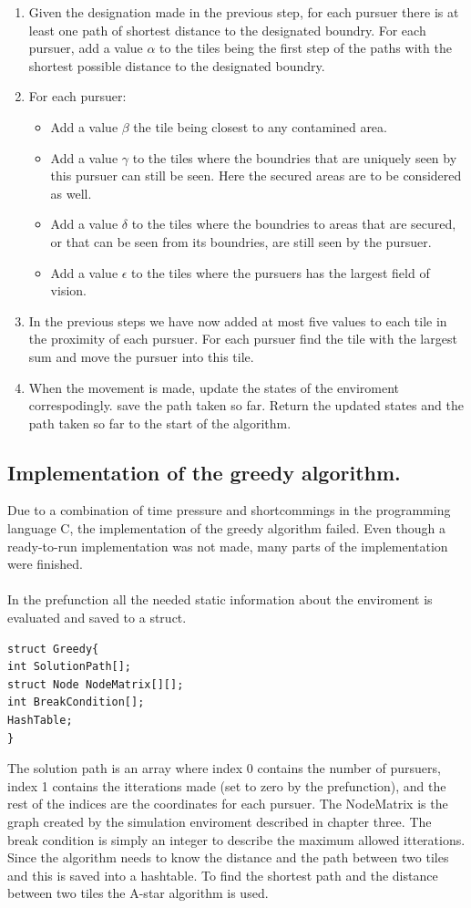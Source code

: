 \begin{enumerate}
\item{} Given the designation made in the previous step, for each pursuer there is at least one path of shortest distance to the designated boundry. For each pursuer,  add a value $\alpha$ to the tiles being the first step of the paths with the shortest possible distance to the designated boundry.
\item{} For each pursuer:
\begin{itemize}
\item{} Add a value $\beta$ the tile being closest to any contamined area. 
\item{} Add a value $\gamma$ to the tiles where the boundries that are uniquely seen by this pursuer can still be seen. Here the secured areas are to be considered as well.
\item{} Add a value $\delta$ to the tiles where the boundries to areas that are secured, or that can be seen from its boundries, are still seen by the pursuer.
\item{} Add a value $\epsilon$ to the tiles where the pursuers has the largest field of vision.
\end{itemize}
\item{} In the previous steps we have now added at most five values to each tile in the proximity of each pursuer. For each pursuer find the tile with the largest sum and move the pursuer into this tile.
\item{} When the movement is made, update the states of the enviroment correspodingly. save the path taken so far. Return the updated states and the path taken so far to the start of the algorithm. 
\end{enumerate}
\subsection{Implementation of the greedy algorithm.}
Due to a combination of time pressure and shortcommings in the programming language C, the implementation of the greedy algorithm failed. Even though a ready-to-run implementation was not made, many parts of the implementation were finished.\\
\\In the prefunction all the needed static information about the enviroment is evaluated and saved to a struct. 
\begin{verbatim}
struct Greedy{
int SolutionPath[]; 
struct Node NodeMatrix[][];
int BreakCondition[];
HashTable; 
}
\end{verbatim}
The solution path is an array where index 0 contains the number of pursuers, index 1 contains the itterations made (set to zero by the prefunction), and the rest of the indices are the coordinates for each pursuer. The NodeMatrix is the graph created by the simulation enviroment described in chapter three. The break condition is simply an integer to describe the maximum allowed itterations. Since the algorithm needs to know the distance and the path between two tiles and this is saved into a hashtable. To find the shortest path and the distance between two tiles the A-star algorithm is used. 

